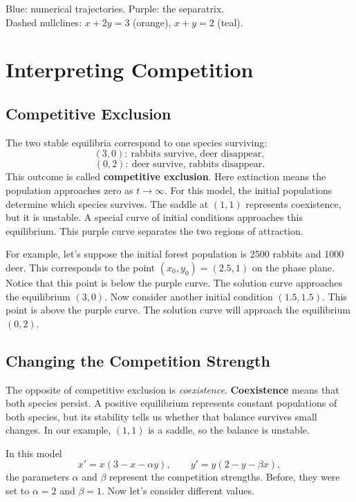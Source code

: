 \documentclass[10pt,letterpaper]{article}
\begin{document}
\begin{center}
\small
Blue: numerical trajectories. Purple: the separatrix.\\
Dashed nullclines: $x+2y=3$ (orange), $x+y=2$ (teal).
\end{center}

\section{Interpreting Competition}

\subsection{Competitive Exclusion}

The two stable equilibria correspond to one species
surviving:
\[
(3,0):\ \text{rabbits survive, deer disappear},
\]
\[
(0,2):\ \text{deer survive, rabbits disappear}.
\]
This outcome is called \textbf{competitive exclusion}.
Here extinction means the population approaches zero as $t\to\infty$.
For this model, the initial populations determine
which species survives. The saddle at $(1,1)$ represents coexistence,
but it is unstable. A special curve of initial
conditions approaches this equilibrium. This purple curve
separates the two regions of attraction.

For example, let's suppose the initial forest population is 2500 rabbits and 1000 deer. This corresponds to the point $(x_0,y_0)=(2.5,1)$ on the phase plane. Notice that this point is below the purple curve. The solution curve approaches the equilibrium $(3,0)$. Now consider another initial condition $(1.5,1.5)$. This point is above the purple curve. The solution curve will approach the equilibrium $(0,2)$.

\subsection{Changing the Competition Strength}
The opposite of competitive exclusion is \textit{coexistence}. \textbf{Coexistence} means that both species persist. A positive equilibrium represents constant populations of both species, but its
stability tells us whether that balance survives small changes.
In our example, $(1,1)$ is a saddle, so the balance is unstable.

In this model
\[
x'=x(3-x-\alpha y),\qquad y'=y(2-y-\beta x),
\]
the parameters $\alpha$ and $\beta$ represent the competition strengths. Before, they were set to $\alpha=2$ and $\beta=1$. Now let's consider different values.
\end{document}
